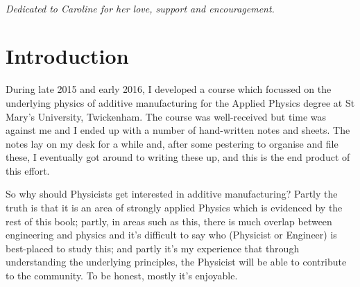 \documentclass[nols,a4paper,twoside,symmetric,justified,marginals=raggedouter]{tufte-book} %
\newcommand{\doccls}[1]{\texttt{#1}}
\begin{document}

\tableofcontents %


\listoffigures %


\listoftables %


\cleardoublepage
~\vfill
\begin{doublespace}
\noindent\fontsize{18}{22}\selectfont\itshape
\nohyphenation
Dedicated to Caroline for her love, support and encouragement.
\end{doublespace}
\vfill
\vfill


\cleardoublepage
\chapter*{Introduction} %


During late 2015 and early 2016, I developed a course which focussed on the underlying physics of additive manufacturing for the Applied Physics degree at St Mary's University, Twickenham. The course was well-received but time was against me and I ended up with a number of hand-written notes and sheets. The notes lay on my desk for a while and, after some pestering to organise and file these, I eventually got around to writing these up, and this is the end product of this effort. 

So why should Physicists get interested in additive manufacturing? Partly the truth is that it is an area of strongly applied Physics which is evidenced by the rest of this book; partly, in areas such as this, there is much overlap between engineering and physics and it's difficult to say who (Physicist or Engineer) is best-placed to study this; and partly it's my experience that through understanding the underlying principles, the Physicist will be able to contribute to the community. To be honest, mostly it's enjoyable.  
\end{document}
